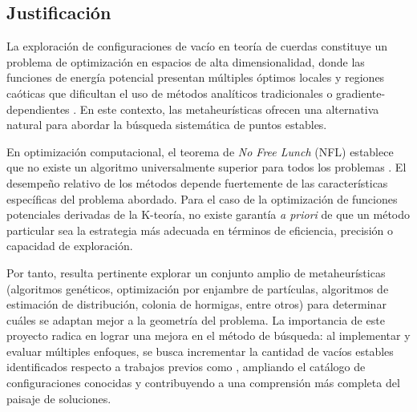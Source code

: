\subsection{Justificación}

La exploración de configuraciones de vacío en teoría de cuerdas
constituye un problema de optimización en espacios de alta
dimensionalidad, donde las funciones de energía potencial
presentan múltiples óptimos locales y regiones caóticas que
dificultan el uso de métodos analíticos tradicionales o
gradiente-dependientes \cite{Lanza_2025, De_Luca_2025}. En este
contexto, las metaheurísticas ofrecen una alternativa natural
para abordar la búsqueda sistemática de puntos estables.

En optimización computacional, el teorema de
\foreignlanguage{english}{\textit{No Free Lunch}} (NFL) establece que no
existe un algoritmo universalmente superior para todos los
problemas
\cite{Wolpert_1997}. El desempeño relativo de los métodos
depende fuertemente de las características específicas del
problema abordado. Para el caso de la optimización de funciones
potenciales derivadas de la K-teoría, no existe garantía
\textit{a priori} de que un método particular sea la estrategia más
adecuada en términos de eficiencia, precisión o capacidad de
exploración.

Por tanto, resulta pertinente explorar un conjunto amplio de
metaheurísticas (algoritmos genéticos, optimización por
enjambre de partículas, algoritmos de estimación de
distribución, colonia de hormigas, entre otros) para determinar
cuáles se adaptan mejor a la geometría del problema.
La importancia de este proyecto radica en lograr una mejora en
el método de búsqueda: al implementar y evaluar múltiples
enfoques, se busca incrementar la cantidad de vacíos estables
identificados respecto a trabajos previos como \cite{Damian_2022},
ampliando el catálogo de configuraciones conocidas y
contribuyendo a una comprensión más completa del paisaje de
soluciones.
